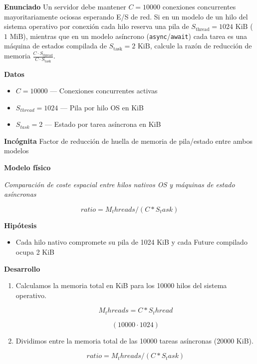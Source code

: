 \documentclass{book}
\begin{document}
\begin{tcolorbox}[title={Problema resuelto}, studiumworked, breakable]

\noindent\textbf{Enunciado}
Un servidor debe mantener \(C = 10000\) conexiones concurrentes mayoritariamente ociosas esperando E/S de red. Si en un modelo de un hilo del sistema operativo por conexión cada hilo reserva una pila de \(S_{\text{thread}} = 1024\text{ KiB}\) (\(1\text{ MiB}\)), mientras que en un modelo asíncrono (\texttt{async}/\texttt{await}) cada tarea es una máquina de estados compilada de \(S_{\text{task}} = 2\text{ KiB}\), calcule la razón de reducción de memoria \(\frac{C \cdot S_{\text{thread}}}{C \cdot S_{\text{task}}}\).

\noindent\textbf{Datos}
\begin{itemize}
\item $C = 10000$ — Conexiones concurrentes activas
\item $S_{thread} = 1024$ — Pila por hilo OS en KiB
\item $S_{task} = 2$ — Estado por tarea asíncrona en KiB
\end{itemize}

\noindent\textbf{Incógnita}
Factor de reducción de huella de memoria de pila/estado entre ambos modelos

\noindent\textbf{Modelo físico}

\noindent\textit{Comparación de coste espacial entre hilos nativos OS y máquinas de estado asíncronas}

\[
ratio = M_threads / (C * S_task)
\]

\noindent\textbf{Hipótesis}
\begin{itemize}
\item Cada hilo nativo compromete su pila de 1024 KiB y cada Future compilado ocupa 2 KiB
\end{itemize}

\noindent\textbf{Desarrollo}
\begin{enumerate}
\item
Calculamos la memoria total en KiB para los 10000 hilos del sistema operativo.

\[
M_threads = C * S_thread
\]

\[
\left(10000\cdot 1024\right)
\]
\item
Dividimos entre la memoria total de las 10000 tareas asíncronas (20000 KiB).

\[
ratio = M_threads / (C * S_task)
\]


\end{enumerate}
\end{tcolorbox}
\end{document}
